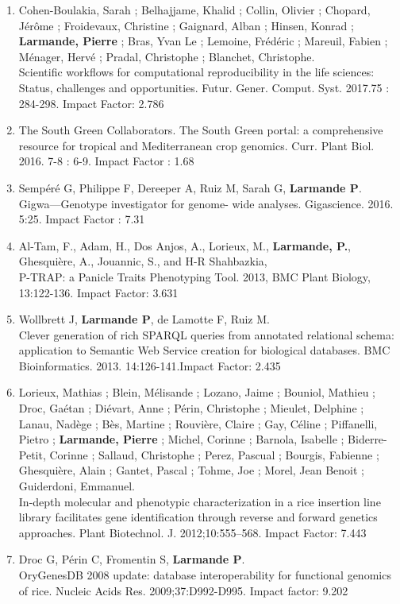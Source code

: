 \begin{enumerate}
\item	Cohen-Boulakia, Sarah ; Belhajjame, Khalid ; Collin, Olivier ; Chopard, Jérôme ; Froidevaux, Christine ; Gaignard, Alban ; Hinsen, Konrad ; \textbf{Larmande, Pierre} ; Bras, Yvan Le ; Lemoine, Frédéric ; Mareuil, Fabien ; Ménager, Hervé ; Pradal, Christophe ; Blanchet, Christophe.\\ Scientific workflows for computational reproducibility in the life sciences: Status, challenges and opportunities. Futur. Gener. Comput. Syst. 2017.75 : 284-298. Impact Factor: 2.786
\item	The South Green Collaborators. The South Green portal: a comprehensive resource for tropical and Mediterranean crop genomics. Curr. Plant Biol. 2016. 7-8 : 6-9. Impact Factor : 1.68
\item	Sempéré G, Philippe F, Dereeper A, Ruiz M, Sarah G, \textbf{Larmande P}.\\ Gigwa—Genotype investigator for genome- wide analyses. Gigascience. 2016. 5:25. Impact Factor : 7.31
\item	Al-Tam, F., Adam, H., Dos Anjos, A., Lorieux, M., \textbf{Larmande, P.}, Ghesquière, A., Jouannic, S., and H-R Shahbazkia,\\ P-TRAP: a Panicle Traits Phenotyping Tool. 2013, BMC Plant Biology, 13:122-136. Impact Factor: 3.631
\item	Wollbrett J, \textbf{Larmande P}, de Lamotte F, Ruiz M.\\ Clever generation of rich SPARQL queries from annotated relational schema: application to Semantic Web Service creation for biological databases. BMC Bioinformatics. 2013. 14:126-141.Impact Factor: 2.435
\item Lorieux, Mathias ; Blein, Mélisande ; Lozano, Jaime ; Bouniol, Mathieu ; Droc, Gaétan ; Diévart, Anne ; Périn, Christophe ; Mieulet, Delphine ; Lanau, Nadège ; Bès, Martine ; Rouvière, Claire ; Gay, Céline ; Piffanelli, Pietro ; \textbf{Larmande, Pierre} ; Michel, Corinne ; Barnola, Isabelle ; Biderre-Petit, Corinne ; Sallaud, Christophe ; Perez, Pascual ; Bourgis, Fabienne ; Ghesquière, Alain ; Gantet, Pascal ; Tohme, Joe ; Morel, Jean Benoit ; Guiderdoni, Emmanuel.\\ In-depth molecular and phenotypic characterization in a rice insertion line library facilitates gene identification through reverse and forward genetics approaches. Plant Biotechnol. J. 2012;10:555–568. Impact Factor: 7.443
\item	Droc G, Périn C, Fromentin S, \textbf{Larmande P}.\\ OryGenesDB 2008 update: database interoperability for functional genomics of rice. Nucleic Acids Res. 2009;37:D992-D995. Impact factor: 9.202

\end{enumerate}
